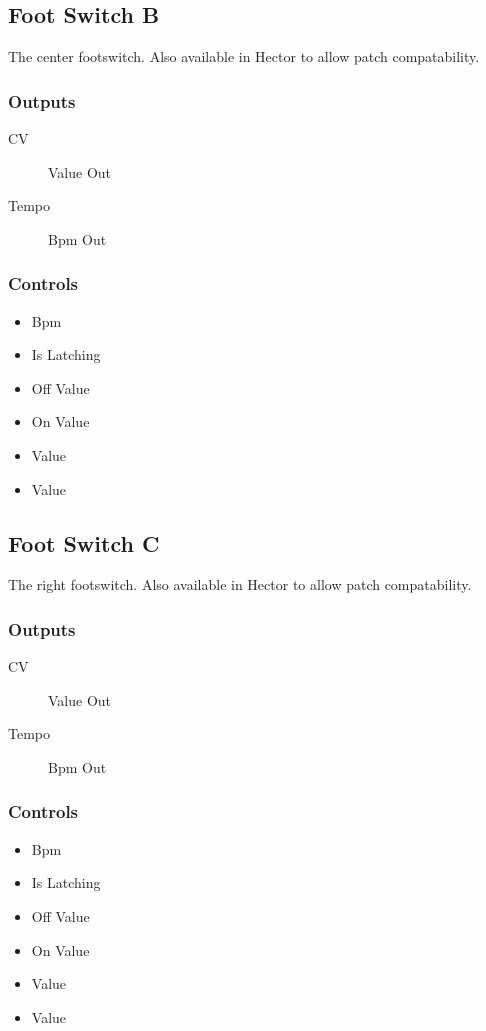 \subsection{Foot Switch B}

The center footswitch. Also available in Hector to allow patch compatability.



\subsubsection{Outputs}
\begin{description}
\item [CV] Value Out
\item [Tempo] Bpm Out
\end{description}

\subsubsection{Controls}
\begin{itemize}
\item Bpm
\item Is Latching
\item Off Value
\item On Value
\item Value
\item Value
\end{itemize}

\subsection{Foot Switch C}

The right footswitch. Also available in Hector to allow patch compatability.



\subsubsection{Outputs}
\begin{description}
\item [CV] Value Out
\item [Tempo] Bpm Out
\end{description}

\subsubsection{Controls}
\begin{itemize}
\item Bpm
\item Is Latching
\item Off Value
\item On Value
\item Value
\item Value
\end{itemize}

